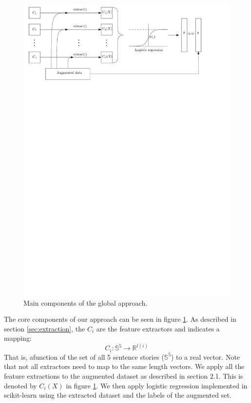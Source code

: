\documentclass{article}
\begin{document}
	\begin{figure}[h!]
		\centering
		\includegraphics[scale=0.8]{fig/logistic_fitting.pdf}
		\caption{Main components of the global approach.}
		\label{Main}
	\end{figure}

The core components of our approach can be seen in figure \ref*{Main}. As described in section \ref{sec:extraction}, the $C_i$ are the feature extractors and indicates a mapping:
\begin{equation}
C_i: \mathbb{S}^5 \rightarrow \mathbb{R}^{l(i)}
\end{equation}
That is, afunction of the set of all 5 sentence stories ($\mathbb{S}^5$) to a real vector. Note that not all extractors need to map to the same length vectors. We apply all the feature extractions to the augmented dataset as described in section 2.1. This is denoted by $C_i(X)$ in figure \ref*{Main}. We then apply logistic regression implemented in scikit-learn \cite{SKL} using the extracted dataset and the labels of the augmented set.
\end{document}
